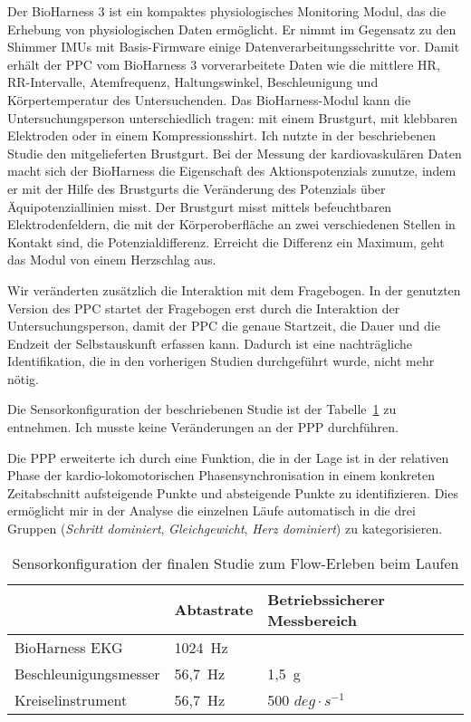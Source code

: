 Der BioHarness 3 ist ein kompaktes physiologisches Monitoring Modul, das die Erhebung von physiologischen Daten ermöglicht. Er nimmt im Gegensatz zu den Shimmer \acp{IMU} mit Basis-Firmware einige Datenverarbeitungsschritte vor. Damit erhält der \ac{PPC} vom BioHarness 3 vorverarbeitete Daten wie die mittlere \ac{HR}, RR-Intervalle, Atemfrequenz, Haltungswinkel, Beschleunigung und Körpertemperatur des Untersuchenden. Das BioHarness-Modul kann die Untersuchungsperson unterschiedlich tragen: mit einem Brustgurt, mit klebbaren Elektroden oder in einem Kompressionsshirt. Ich nutzte in der beschriebenen Studie den mitgelieferten Brustgurt. Bei der Messung der kardiovaskulären Daten macht sich der BioHarness die Eigenschaft des Aktionspotenzials zunutze, indem er mit der Hilfe des Brustgurts die Veränderung des Potenzials über Äquipotenziallinien misst. Der Brustgurt misst mittels befeuchtbaren Elektrodenfeldern, die mit der Körperoberfläche an zwei verschiedenen Stellen in Kontakt sind, die Potenzialdifferenz. Erreicht die Differenz ein Maximum, geht das Modul von einem Herzschlag aus. 

Wir veränderten zusätzlich die Interaktion mit dem Fragebogen. In der genutzten Version des \ac{PPC} startet der Fragebogen erst durch die Interaktion der Untersuchungsperson, damit der \ac{PPC} die genaue Startzeit, die Dauer und die Endzeit der Selbstauskunft erfassen kann. Dadurch ist eine nachträgliche Identifikation, die in den vorherigen Studien durchgeführt wurde, nicht mehr nötig. 

Die Sensorkonfiguration der beschriebenen Studie ist der Tabelle~\ref{tab:sensorkonfiguration_3} zu entnehmen. Ich musste keine Veränderungen an der \ac{PPP} durchführen. 

Die \ac{PPP} erweiterte ich durch eine Funktion, die in der Lage ist in der relativen Phase der kardio-lokomotorischen Phasensynchronisation in einem konkreten Zeitabschnitt aufsteigende Punkte und absteigende Punkte zu identifizieren. Dies ermöglicht mir in der Analyse die einzelnen Läufe automatisch in die drei Gruppen (\emph{Schritt dominiert}, \emph{Gleichgewicht}, \emph{Herz dominiert}) zu kategorisieren. 

\begin{table}
	[!htb] \caption[Sensorkonfiguration (Finale Studie: Laufen)]{Sensorkonfiguration der finalen Studie zum Flow-Erleben beim Laufen} \label{tab:sensorkonfiguration_3} 
	\begin{tabularx}
		{ 
		\textwidth}{p{} p{} p{}} \toprule & Abtastrate & Betriebssicherer Messbereich \\
		\midrule BioHarness \ac{EKG} & 1024~Hz & \\
		Beschleunigungsmesser & 56,7~Hz & 1,5~g \\
		Kreiselinstrument & 56,7~Hz & 500 $deg \cdot s^{-1}$ \\
		\bottomrule 
	\end{tabularx}
\end{table}

